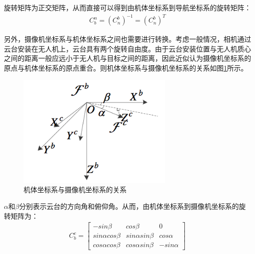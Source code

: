 旋转矩阵为正交矩阵，从而直接可以得到由机体坐标系到导航坐标系的旋转矩阵：
%
\begin{eqnarray}
C_b^n = (C_n^b)^{-1} = (C_n^b)^T
\end{eqnarray}

另外，摄像机坐标系与机体坐标系之间也需要进行转换。考虑一般情况，相机通过云台安装在无人机上，云台具有两个旋转自由度。由于云台安装位置与无人机质心之间的距离一般应远小于无人机与目标之间的距离，因此近似认为摄像机坐标系的原点与机体坐标系的原点重合。则机体坐标系与摄像机坐标系的关系如图\ref{fig:5_2_机体坐标系与摄像机坐标系的关系}所示。

\begin{figure}[htb] %
	\centering
	\includegraphics[width=3in]{figures/5_2_机体坐标系与摄像机坐标系之间的关系}
	\caption{机体坐标系与摄像机坐标系的关系}\label{fig:5_2_机体坐标系与摄像机坐标系的关系}
\end{figure}
$\alpha$和$\beta$分别表示云台的方向角和俯仰角。从而，由机体坐标系到摄像机坐标系的旋转矩阵为\cite{姜运宇2014旋翼无人机跟踪地面移动目标的视觉控制}：
%
\begin{eqnarray}
C_b^c =
\begin{bmatrix}
-sin\beta & cos\beta & 0 \\
sin\alpha cos\beta & sin\alpha sin\beta & cos\alpha \\
cos\alpha cos\beta & cos\alpha sin\beta & -sin\alpha
\end{bmatrix}
\end{eqnarray}

